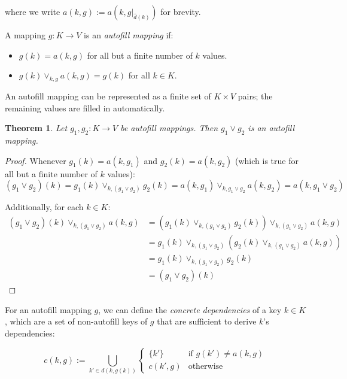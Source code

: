\documentclass{article}
\newtheorem{theorem}{Theorem}
\begin{document}
        where we write $a(k, g) := a(k, g|_{\hat{d}(k)})$ for brevity.


        A mapping $g : K \rightarrow V$ is an \emph{autofill mapping} if:
        
        \begin{itemize}
          \item $g(k) = a(k, g)$ for all but a finite number of $k$ values.
          \item $g(k) \vee_{k, g} a(k, g) = g(k)$ for all $k \in K$.
        \end{itemize}


        An autofill mapping can be represented as a finite set of $K \times V$ pairs; the remaining values are filled in automatically.

        \begin{theorem}
          Let $g_1, g_2 : K \rightarrow V$ be autofill mappings. Then $g_1 \vee g_2$ is an autofill mapping.
        \end{theorem}

        \begin{proof}

          Whenever $g_1(k) = a(k, g_1)$ and $g_2(k) = a(k, g_2)$ (which is true for all but a finite number of $k$ values):
           $$(g_1 \vee g_2)(k) = g_1(k) \vee_{k, (g_1 \vee g_2)} g_2(k) = a(k, g_1) \vee_{k, g_1 \vee g_2} a(k, g_2) = a(k, g_1 \vee g_2)$$

          Additionally, for each $k \in K$:
          \begin{align*}
            (g_1 \vee g_2)(k) \vee_{k, (g_1 \vee g_2)} a(k, g) 
            &= (g_1(k) \vee_{k, (g_1 \vee g_2)} g_2(k)) \vee_{k, (g_1 \vee g_2)} a(k, g) \\
            &= g_1(k) \vee_{k, (g_1 \vee g_2)} (g_2(k) \vee_{k, (g_1 \vee g_2)} a(k, g)) \\
            &= g_1(k) \vee_{k, (g_1 \vee g_2)} g_2(k) \\
            &= (g_1 \vee g_2)(k)
          \end{align*}
        \end{proof}

        For an autofill mapping $g$, we can define the \emph{concrete dependencies} of a key $k \in K$, which are a set of non-autofill keys of $g$ that are sufficient to derive $k$'s dependencies:

        $$c(k, g) := \bigcup_{k' \in d(k, g(k))} \begin{cases}
          \{k'\} & \text{if } g(k') \neq a(k, g) \\
          c(k', g) & \text{otherwise}
        \end{cases}  $$
\end{document}
